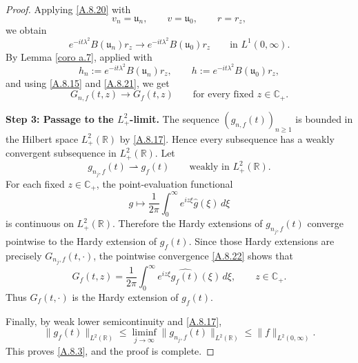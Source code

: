 \documentclass[10pt]{article}
\numberwithin{equation}{section}
\numberwithin{theorem}{section}
\begin{document}
\begin{appendix}
\begin{proof}
Applying \eqref{A.8.20} with
\[
v_n=\mathfrak u_n,
\qquad
v=\mathfrak u_0,
\qquad
r=r_z,
\]
we obtain
\begin{equation}
\label{A.8.21}
e^{-it\lambda^2}B(\mathfrak u_n)r_z
\longrightarrow
e^{-it\lambda^2}B(\mathfrak u_0)r_z
\qquad\text{in }L^1(0,\infty).
\end{equation}
By Lemma \ref{coro a.7}, applied with
\[
h_n:=e^{-it\lambda^2}B(\mathfrak u_n)r_z,
\qquad
h:=e^{-it\lambda^2}B(\mathfrak u_0)r_z,
\]
and using \eqref{A.8.15} and \eqref{A.8.21}, we get
\begin{equation}
\label{A.8.22}
G_{n,f}(t,z)\to G_f(t,z)
\qquad\text{for every fixed }z\in\mathbb C_+.
\end{equation}

\medskip
\noindent
\textbf{Step 3: Passage to the \(L^2_+\)-limit.}
The sequence \((g_{n,f}(t))_{n\ge1}\) is bounded in the Hilbert space
\(L^2_+(\mathbb R)\) by \eqref{A.8.17}. Hence every subsequence has a weakly convergent
subsequence in \(L^2_+(\mathbb R)\). Let
\[
g_{n_j,f}(t)\rightharpoonup g_f(t)
\qquad\text{weakly in }L^2_+(\mathbb R).
\]
For each fixed \(z\in\mathbb C_+\), the point-evaluation functional
\[
g\mapsto
\frac1{2\pi}
\int_0^\infty e^{iz\xi}\widehat g(\xi)\,d\xi
\]
is continuous on \(L^2_+(\mathbb R)\). Therefore the Hardy extensions of
\(g_{n_j,f}(t)\) converge pointwise to the Hardy extension of \(g_f(t)\). Since those
Hardy extensions are precisely \(G_{n_j,f}(t,\cdot)\), the pointwise convergence
\eqref{A.8.22} shows that
\[
G_f(t,z)
=
\frac1{2\pi}
\int_0^\infty e^{iz\xi}\widehat{g_f(t)}(\xi)\,d\xi,
\qquad z\in\mathbb C_+.
\]
Thus \(G_f(t,\cdot)\) is the Hardy extension of \(g_f(t)\). 

Finally, by weak lower semicontinuity and \eqref{A.8.17},
\[
\|g_f(t)\|_{L^2(\mathbb R)}
\le
\liminf_{j\to\infty}
\|g_{n_j,f}(t)\|_{L^2(\mathbb R)}
\le
\|f\|_{L^2(0,\infty)}.
\]
This proves \eqref{A.8.3}, and the proof is complete.
\end{proof}
\end{appendix}
\end{document}
